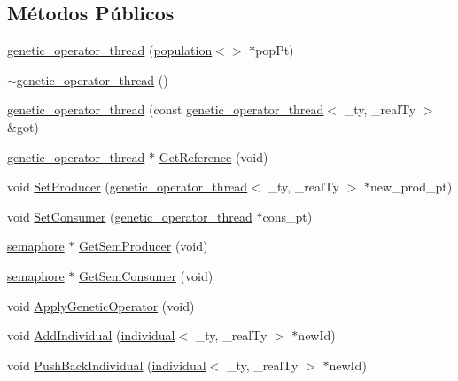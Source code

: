\subsection*{Métodos Públicos}
\begin{DoxyCompactItemize}
\item 
\hyperlink{classgenetic__operator__thread_a2b60b46c5d55135436590f6aa2b11da3}{genetic\_\-operator\_\-thread} (\hyperlink{classpopulation}{population}$<$$>$ $\ast$popPt)
\item 
\hyperlink{classgenetic__operator__thread_a30c4b7a10dae2ff72905416953a64049}{$\sim$genetic\_\-operator\_\-thread} ()
\item 
\hyperlink{classgenetic__operator__thread_adb72da6103f5995bd4c265789e5eceac}{genetic\_\-operator\_\-thread} (const \hyperlink{classgenetic__operator__thread}{genetic\_\-operator\_\-thread}$<$ \_\-ty, \_\-realTy $>$ \&got)
\item 
\hyperlink{classgenetic__operator__thread}{genetic\_\-operator\_\-thread} $\ast$ \hyperlink{classgenetic__operator__thread_a751c7f678d7486bee8b1a02bb9e60416}{GetReference} (void)
\item 
void \hyperlink{classgenetic__operator__thread_a435435aa8c4e9f50b041b40c7f63b599}{SetProducer} (\hyperlink{classgenetic__operator__thread}{genetic\_\-operator\_\-thread}$<$ \_\-ty, \_\-realTy $>$ $\ast$new\_\-prod\_\-pt)
\item 
void \hyperlink{classgenetic__operator__thread_a2944e0158bc914db042fdcf22a4a4e70}{SetConsumer} (\hyperlink{classgenetic__operator__thread}{genetic\_\-operator\_\-thread} $\ast$cons\_\-pt)
\item 
\hyperlink{classsemaphore}{semaphore} $\ast$ \hyperlink{classgenetic__operator__thread_aa9a6e0370bfd3afe316af822832a8013}{GetSemProducer} (void)
\item 
\hyperlink{classsemaphore}{semaphore} $\ast$ \hyperlink{classgenetic__operator__thread_a73424d811348f5a911da3744dfc08762}{GetSemConsumer} (void)
\item 
void \hyperlink{classgenetic__operator__thread_abd1a0cb47d379e74f3e738f5c75fe7b7}{ApplyGeneticOperator} (void)
\item 
void \hyperlink{classgenetic__operator__thread_a5e739f35ac03b42311540dbf4db25d2e}{AddIndividual} (\hyperlink{classindividual}{individual}$<$ \_\-ty, \_\-realTy $>$ $\ast$newId)
\item 
void \hyperlink{classgenetic__operator__thread_a1e355fe496238b6433bbf9f3f70bf6ad}{PushBackIndividual} (\hyperlink{classindividual}{individual}$<$ \_\-ty, \_\-realTy $>$ $\ast$newId)
$$
\end{DoxyCompactItemize}
